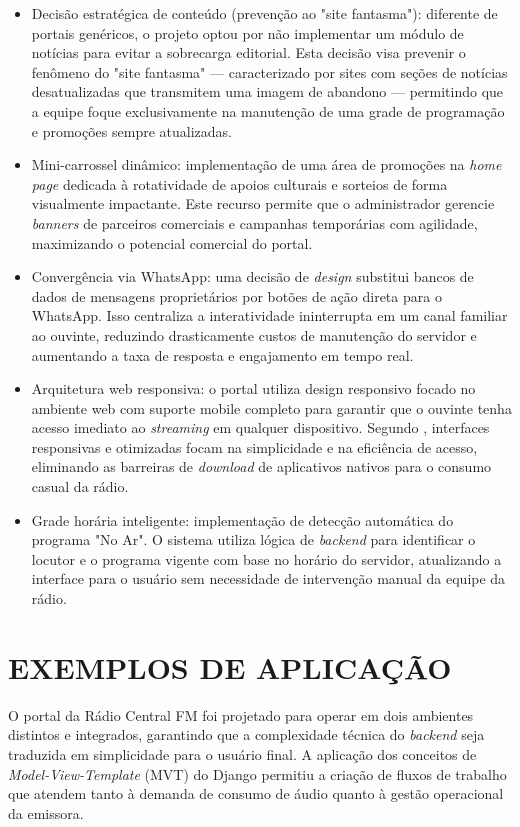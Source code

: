 \documentclass[12pt, openright, oneside, a4paper, brazil]{ads-unipac-abntex2}
\begin{document}
\begin{itemize}
    \item Decisão estratégica de conteúdo (prevenção ao "site fantasma"): diferente de portais genéricos, o projeto optou por não implementar um módulo de notícias para evitar a sobrecarga editorial. Esta decisão visa prevenir o fenômeno do "site fantasma" — caracterizado por sites com seções de notícias desatualizadas que transmitem uma imagem de abandono — permitindo que a equipe foque exclusivamente na manutenção de uma grade de programação e promoções sempre atualizadas.
    \item Mini-carrossel dinâmico: implementação de uma área de promoções na \textit{home page} dedicada à rotatividade de apoios culturais e sorteios de forma visualmente impactante. Este recurso permite que o administrador gerencie \textit{banners} de parceiros comerciais e campanhas temporárias com agilidade, maximizando o potencial comercial do portal.
    \item Convergência via WhatsApp: uma decisão de \textit{design} substitui bancos de dados de mensagens proprietários por botões de ação direta para o WhatsApp. Isso centraliza a interatividade ininterrupta em um canal familiar ao ouvinte, reduzindo drasticamente custos de manutenção do servidor e aumentando a taxa de resposta e engajamento em tempo real.
    \item Arquitetura web responsiva: o portal utiliza design responsivo focado no ambiente web com suporte mobile completo para garantir que o ouvinte tenha acesso imediato ao \textit{streaming} em qualquer dispositivo. Segundo , interfaces responsivas e otimizadas focam na simplicidade e na eficiência de acesso, eliminando as barreiras de \textit{download} de aplicativos nativos para o consumo casual da rádio.
    \item Grade horária inteligente: implementação de detecção automática do programa "No Ar". O sistema utiliza lógica de \textit{backend} para identificar o locutor e o programa vigente com base no horário do servidor, atualizando a interface para o usuário sem necessidade de intervenção manual da equipe da rádio.
\end{itemize}

\section{EXEMPLOS DE APLICAÇÃO}
O portal da Rádio Central FM foi projetado para operar em dois ambientes distintos e integrados, garantindo que a complexidade técnica do \textit{backend} seja traduzida em simplicidade para o usuário final. A aplicação dos conceitos de \textit{Model-View-Template} (MVT) do Django permitiu a criação de fluxos de trabalho que atendem tanto à demanda de consumo de áudio quanto à gestão operacional da emissora.
\end{document}
